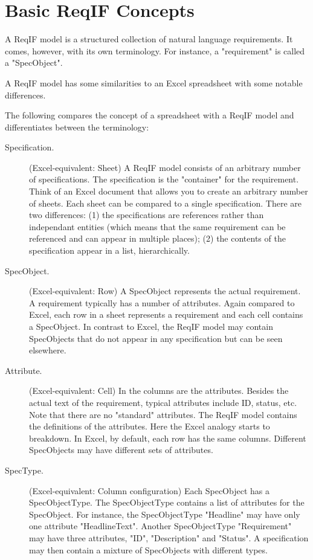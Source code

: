 \section{Basic ReqIF Concepts}

A ReqIF model is a structured collection of natural language requirements.  It comes, however, with its own terminology.  For instance, a "requirement" is called a "SpecObject".

A ReqIF model has some similarities to an Excel spreadsheet with some notable differences.

The following compares the concept of a spreadsheet with a ReqIF model and differentiates between the terminology:

\begin{description}
  \item[Specification.] (Excel-equivalent: Sheet) A ReqIF model consists of an arbitrary number of specifications.  The specification is the "container" for the requirement.  Think of an Excel document that allows you to create an arbitrary number of sheets.  Each sheet can be compared to a single specification.  There are two differences: (1) the specifications are references rather than independant entities (which means that the same requirement can be referenced and can appear in multiple places); (2) the contents of the specification appear in a list, hierarchically.

  \item[SpecObject.] (Excel-equivalent: Row) A SpecObject represents the actual requirement.  A requirement typically has a number of attributes.  Again compared to Excel, each row in a sheet represents a requirement and each cell contains a SpecObject.  In contrast to Excel, the ReqIF model may contain SpecObjects that do not appear in any specification but can be seen elsewhere.

  \item[Attribute.] (Excel-equivalent: Cell) In the columns are the attributes. Besides the actual text of the requirement, typical attributes include ID, status, etc.  Note that there are no "standard" attributes.  The ReqIF model contains the definitions of the attributes.  Here the Excel analogy starts to breakdown.  In Excel, by default, each row has the same columns.  Different SpecObjects may have different sets of attributes.

  \item[SpecType.] (Excel-equivalent: Column configuration) Each SpecObject has a SpecObjectType.  The SpecObjectType contains a list of attributes for the SpecObject.  For instance, the SpecObjectType "Headline" may have only one attribute "HeadlineText".  Another SpecObjectType "Requirement" may have three attributes, "ID", "Description" and "Status".  A specification may then contain a mixture of SpecObjects with different types.

\end{description}

